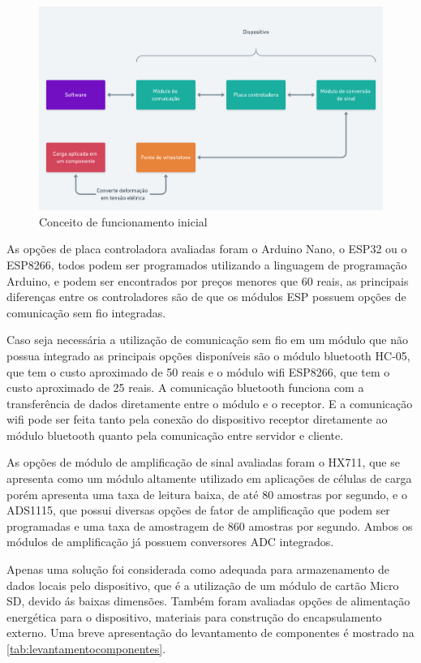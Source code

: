 \begin{figure}[H]
	\caption{\label{fig:2035} Conceito de funcionamento inicial}
	\begin{center}
		\includegraphics[width=\textwidth]{pictures/2035.png}
	\end{center}
\end{figure}

As opções de placa controladora avaliadas foram o Arduino Nano, o ESP32 ou o ESP8266, todos podem ser programados utilizando a linguagem de programação Arduino, e podem ser
encontrados por preços menores que 60 reais, as principais diferenças entre os controladores são de que os módulos ESP possuem opções de comunicação sem fio integradas.

Caso seja necessária a utilização de comunicação sem fio em um módulo que não possua integrado as principais opções disponíveis são o módulo bluetooth HC-05, que tem o custo
aproximado de 50 reais e o módulo wifi ESP8266, que tem o custo aproximado de 25 reais.
A comunicação bluetooth funciona com a transferência de dados diretamente entre o módulo e o receptor.
E a comunicação wifi pode ser feita tanto pela conexão do dispositivo receptor diretamente ao módulo bluetooth quanto pela comunicação entre servidor e cliente.

As opções de módulo de amplificação de sinal avaliadas foram o HX711, que se apresenta como um módulo altamente utilizado em aplicações de células de carga porém apresenta
uma taxa de leitura baixa, de até 80 amostras por segundo, e o ADS1115, que possui diversas opções de fator de amplificação que podem ser programadas e uma taxa de amostragem de 860 amostras
por segundo.
Ambos os módulos de amplificação já possuem conversores ADC integrados.

Apenas uma solução foi considerada como adequada para armazenamento de dados locais pelo dispositivo, que é a utilização de um módulo de cartão Micro SD, devido ás baixas dimensões.
Também foram avaliadas opções de alimentação energética para o dispositivo, materiais para construção do encapsulamento externo.
Uma breve apresentação do levantamento de componentes é mostrado na \autoref{tab:levantamentocomponentes}.

